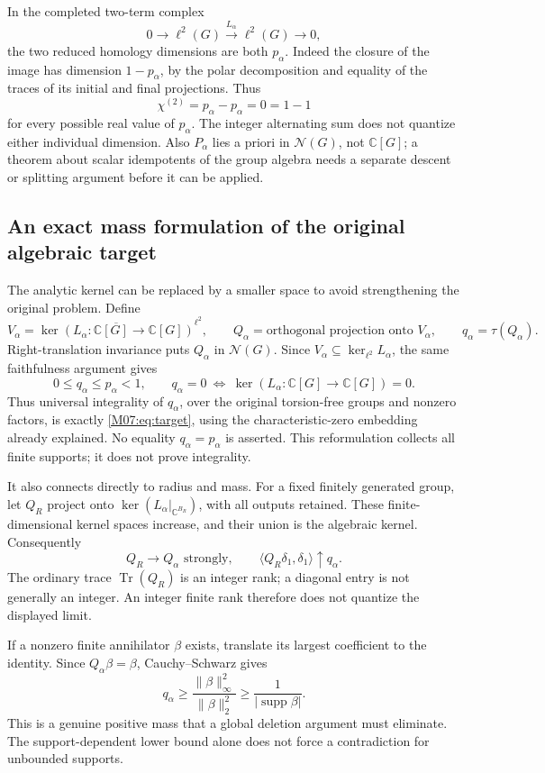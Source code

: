 \documentclass[11pt,a4paper,oneside]{report}
\theoremstyle{definition}
\theoremstyle{remark}
\DeclareMathOperator{\supp}{supp}
\newcommand{\C}{\mathbb C}
\begin{document}
In the completed two-term complex
\[
0\longrightarrow\ell^2(G)\xrightarrow{L_\alpha}
\ell^2(G)\longrightarrow0,
\]
the two reduced homology dimensions are both $p_\alpha$.
Indeed the closure of the image has dimension
$1-p_\alpha$, by the polar decomposition and equality
of the traces of its initial and final projections.
Thus
\[
\chi^{(2)}=p_\alpha-p_\alpha=0=1-1
\]
for every possible real value of $p_\alpha$.
The integer alternating sum does not quantize either
individual dimension. Also $P_\alpha$ lies a priori in
$\mathcal N(G)$, not $\C[G]$; a theorem about scalar
idempotents of the group algebra needs a separate
descent or splitting argument before it can be applied.

\subsection{An exact mass formulation of the original algebraic target}

The analytic kernel can be replaced by a smaller space to
avoid strengthening the original problem. Define
\[
V_\alpha=\overline{\ker(L_\alpha:\C[G]\to\C[G])}^{\ell^2},
\qquad Q_\alpha=\text{orthogonal projection onto }V_\alpha,
\qquad q_\alpha=\tau(Q_\alpha).
\]
Right-translation invariance puts $Q_\alpha$ in $\mathcal N(G)$.
Since $V_\alpha\subseteq\ker_{\ell^2}L_\alpha$, the same
faithfulness argument gives
\[
0\le q_\alpha\le p_\alpha<1,\qquad
q_\alpha=0\ \Longleftrightarrow\
\ker(L_\alpha:\C[G]\to\C[G])=0.
\]
Thus universal integrality of $q_\alpha$, over the original
torsion-free groups and nonzero factors, is exactly
\eqref{M07:eq:target}, using the characteristic-zero embedding
already explained. No equality $q_\alpha=p_\alpha$ is
asserted. This reformulation collects all finite supports;
it does not prove integrality.

It also connects directly to radius and mass. For a fixed
finitely generated group, let $Q_R$ project onto
$\ker(L_\alpha|_{\C^{B_R}})$, with all outputs retained.
These finite-dimensional kernel spaces increase, and their
union is the algebraic kernel. Consequently
\[
Q_R\longrightarrow Q_\alpha\text{ strongly},\qquad
\langle Q_R\delta_1,\delta_1\rangle\uparrow q_\alpha.
\]
The ordinary trace $\operatorname{Tr}(Q_R)$ is an integer
rank; a diagonal entry is not generally an integer. An
integer finite rank therefore does not quantize the
displayed limit.

If a nonzero finite annihilator $\beta$ exists, translate
its largest coefficient to the identity. Since
$Q_\alpha\beta=\beta$, Cauchy--Schwarz gives
\begin{equation}\label{M07:eq:algebraicmass}
\boxed{q_\alpha\ge
\frac{\|\beta\|_\infty^2}{\|\beta\|_2^2}
\ge\frac1{|\supp\beta|}.}
\end{equation}
This is a genuine positive mass that a global deletion
argument must eliminate. The support-dependent lower
bound alone does not force a contradiction for unbounded
supports.
\end{document}

